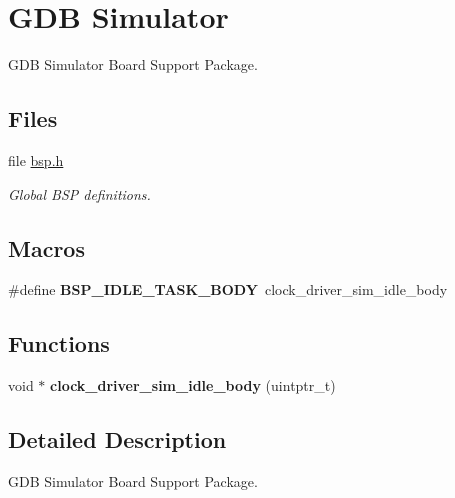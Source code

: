 \hypertarget{group__RTEMSBSPsV850GDBSim}{}\section{G\+DB Simulator}
\label{group__RTEMSBSPsV850GDBSim}


G\+DB Simulator Board Support Package.  


\subsection*{Files}
\begin{DoxyCompactItemize}
\item 
file \mbox{\hyperlink{bsps_2v850_2gdbv850sim_2include_2bsp_8h}{bsp.\+h}}
\begin{DoxyCompactList}\small\item\em Global B\+SP definitions. \end{DoxyCompactList}\end{DoxyCompactItemize}
\subsection*{Macros}
\begin{DoxyCompactItemize}
\item 
\mbox{\label{group__RTEMSBSPsV850GDBSim_ga4aa606d0badadcc28e8054cb60f13b56}} 
\#define {\bfseries B\+S\+P\+\_\+\+I\+D\+L\+E\+\_\+\+T\+A\+S\+K\+\_\+\+B\+O\+DY}~clock\+\_\+driver\+\_\+sim\+\_\+idle\+\_\+body
\end{DoxyCompactItemize}
\subsection*{Functions}
\begin{DoxyCompactItemize}
\item 
\mbox{\label{group__RTEMSBSPsV850GDBSim_ga44e69833220d6f060ab637fd7f53ca26}} 
void $\ast$ {\bfseries clock\+\_\+driver\+\_\+sim\+\_\+idle\+\_\+body} (uintptr\+\_\+t)
\end{DoxyCompactItemize}


\subsection{Detailed Description}
G\+DB Simulator Board Support Package. 

